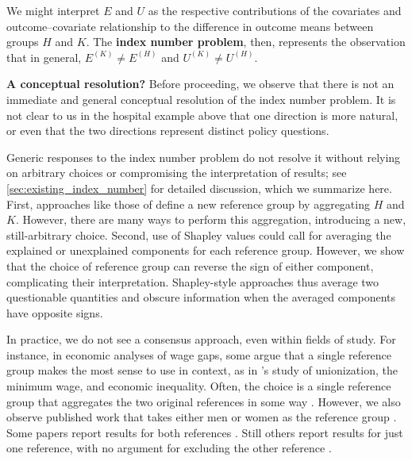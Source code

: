 We might interpret $E$ and $U$ as the respective contributions of the covariates and outcome--covariate relationship to the 
difference in outcome means between groups $H$ and $K$. The \textbf{index number problem}, then, represents the observation
that in general, $E^{(K)} \neq E^{(H)}$ and $U^{(K)} \neq U^{(H)}$.

\textbf{A conceptual resolution?}
Before proceeding, we observe that there is not an immediate and general conceptual resolution of the index number problem.
It is not clear to us in the hospital example above that one direction is more natural, or even that the two directions represent distinct policy questions.

Generic responses to the index number problem do not resolve it without relying on arbitrary choices or compromising the interpretation of results; see \cref{sec:existing_index_number} for detailed discussion, which we summarize here.
First, approaches like those of \citet{oaxacaRansom1998,neumark1988} define a new reference group by aggregating $H$ and $K$. However, there are many ways to perform this aggregation, introducing a new, still-arbitrary choice.
Second, use of Shapley values \citep{Shapley1953} could call for averaging the explained or unexplained components for each reference group.
However, we show that the choice of reference group can reverse the sign of either component, complicating their interpretation. 
Shapley-style approaches thus average two questionable quantities and obscure information when the averaged components have opposite signs.

In practice, we do not see a consensus approach, even within fields of study.
For instance, in economic analyses of wage gaps, some argue that a single reference group makes the most sense to use in context, as in \citet{dinardoFortinLemieux1996}'s study of unionization, the minimum wage, and economic inequality.
Often, the choice is a single reference group that aggregates the two original references in some way \citep{oaxacaRansom1994,reimers1983,cotton1988,kassenboehmer2014distributional,sharafRashad2016,rahimiNazari2021,Allen2022,bachan2022genderchancellor}.
However, we also observe published work that takes either men or women as the reference group \citep{nielsen2000wage,piazzalunga2019increase,leythienne2021paygapeu,tao2024gender,paradaContzen2025}.
Some papers report results for both references \citep{ONeill2006,fortinLemieuxFirpo2011,sharafRashad2016,rahimiNazari2021}. 
Still others report results for just one reference, with no argument for excluding the other reference \citep{zhang_2019, ayubiShahbaziKhazaei2024,paradaContzen2025,singleton2016,lamJamiesonMittinty2021,leythienne2021paygapeu,alHanawiNjagi2022,tao2024gender}.

